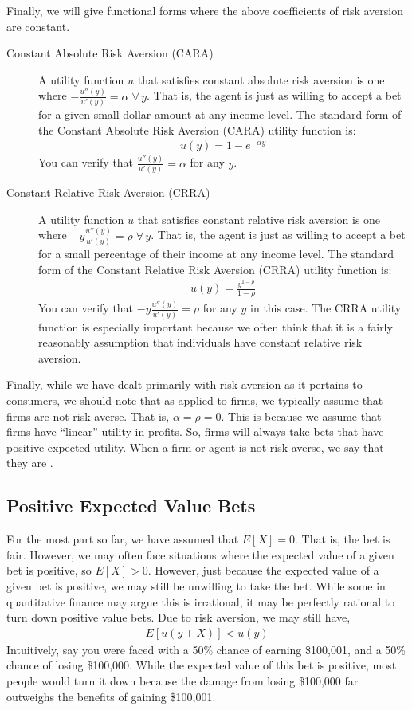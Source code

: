 Finally, we will give functional forms where the above coefficients of risk aversion are constant. 
\begin{description}
    \item[Constant Absolute Risk Aversion (CARA)] A utility function $u$ that satisfies constant absolute risk aversion is one where $-\frac{u''(y)}{u'(y)} = \alpha \; \forall \, y$. That is, the agent is just as willing to accept a bet for a given small dollar amount at any income level. The standard form of the Constant Absolute Risk Aversion (CARA) utility function is:
    \begin{align*}
        u(y) = 1 - e^{-\alpha y}
    \end{align*} 
    You can verify that $\frac{u''(y)}{u'(y)} = \alpha$ for any $y$. 
    \item[Constant Relative Risk Aversion (CRRA)] A utility function $u$ that satisfies constant relative risk aversion is one where $-y \frac{u''(y)}{u'(y)} = \rho \; \forall \, y$. That is, the agent is just as willing to accept a bet for a small percentage of their income at any income level. The standard form of the Constant Relative Risk Aversion (CRRA) utility function is: 
    \begin{align*}
        u(y) = \frac{y^{1 - \rho}}{1 - \rho}
    \end{align*} 
    You can verify that $-y\frac{u''(y)}{u'(y)} = \rho$ for any $y$ in this case. The CRRA utility function is especially important because we often think that it is a fairly reasonably assumption that individuals have constant relative risk aversion. 
\end{description}

Finally, while we have dealt primarily with risk aversion as it pertains to consumers, we should note that as applied to firms, we typically assume that firms are not risk averse. That is, $\alpha = \rho = 0$. This is because we assume that firms have ``linear'' utility in profits. So, firms will always take bets that have positive expected utility. When a firm or agent is not risk averse, we say that they are .  

\subsection*{Positive Expected Value Bets}
For the most part so far, we have assumed that $E[X] = 0$. That is, the bet is fair. However, we may often face situations where the expected value of a given bet is positive, so $E[X] > 0$. However, just because the expected value of a given bet is positive, we may still be unwilling to take the bet. While some in quantitative finance may argue this is irrational, it may be perfectly rational to turn down positive value bets. Due to risk aversion, we may still have,
\begin{align*}
    E[u(y + X)] < u(y)
\end{align*}
Intuitively, say you were faced with a 50\% chance of earning \$100,001, and a 50\% chance of losing \$100,000. While the expected value of this bet is positive, most people would turn it down because the damage from losing \$100,000 far outweighs the benefits of gaining \$100,001. 

